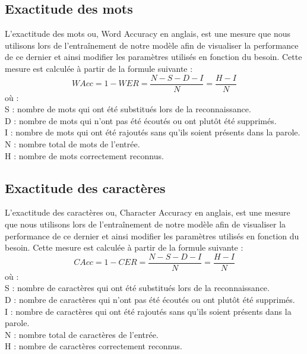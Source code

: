 \subsection{Exactitude des mots}
L'exactitude des mots ou, Word Accuracy en anglais, est une mesure que nous utilisons lors de  l'entraînement de notre modèle afin de visualiser la performance de ce dernier et ainsi modifier les paramètres utilisés en fonction du besoin. Cette mesure est calculée à partir de la formule suivante :\\ 
    \begin{equation}
    WAcc = 1 - WER = \frac{N - S - D - I}{N} = \frac{H - I}{N}
    \end{equation}
    où : \\
        S : nombre de mots qui ont été substitués lors de la reconnaissance.\\
        D : nombre de mots qui n'ont pas été écoutés ou ont plutôt été supprimés.\\
        I : nombre de mots qui ont été rajoutés sans qu'ils soient présents dans la parole.\\
        N : nombre total de mots de l'entrée.\\    
        H : nombre de mots correctement reconnus.

\subsection{Exactitude des caractères}
L'exactitude des caractères ou, Character Accuracy en anglais, est une mesure que nous utilisons lors de  l'entraînement de notre modèle afin de visualiser la performance de ce dernier et ainsi modifier les paramètres utilisés en fonction du besoin. Cette mesure est calculée à partir de la formule suivante :\\ 
    \begin{equation}
    CAcc = 1 - CER = \frac{N - S - D - I}{N} = \frac{H - I}{N}
    \end{equation}
    où : \\
        S : nombre de caractères qui ont été substitués lors de la reconnaissance.\\
        D : nombre de caractères qui n'ont pas été écoutés ou ont plutôt été supprimés.\\
        I : nombre de caractères qui ont été rajoutés sans qu'ils soient présents dans la parole.\\
        N : nombre total de caractères de l'entrée.\\    
        H : nombre de caractères correctement reconnus.



